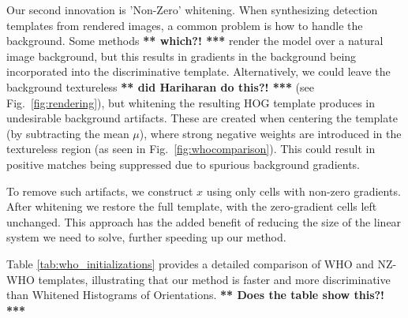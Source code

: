 \documentclass[10pt,twocolumn,letterpaper]{article}
\newcommand{\scream}[1]{{\color{red} \bf *** #1! ***}}
\begin{document}
Our second innovation is 'Non-Zero' whitening. When synthesizing detection templates from rendered images, a common problem is how to handle the background. Some methods \scream{which?} render the model over a natural image background, but this results in gradients in the background being incorporated into the discriminative template. Alternatively, we could leave the background textureless \scream{did Hariharan do this?} (see Fig.~\ref{fig:rendering}), but whitening the resulting HOG template produces in undesirable background artifacts. These are created when centering the template (by subtracting the mean $\mu$), where strong negative weights are introduced in the textureless region (as seen in Fig.~\ref{fig:whocomparison}). This could result in positive matches being suppressed due to spurious background gradients.

To remove such artifacts, we construct $x$ using only cells with non-zero gradients. After whitening we restore the full template, with the zero-gradient cells left unchanged. This approach has the added benefit of reducing the size of the linear system we need to solve, further speeding up our method.

Table \ref{tab:who_initializations} provides a detailed comparison of WHO and NZ-WHO templates, illustrating that our method is faster and more discriminative than Whitened Histograms of Orientations. \scream{Does the table show this?}





\end{document}
